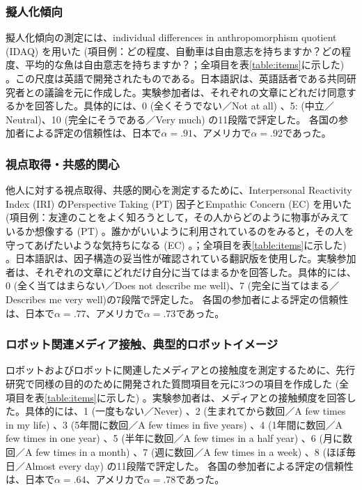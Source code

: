 \documentclass[a4j,12pt]{jreport}
\begin{document}
\subsubsection*{擬人化傾向}
擬人化傾向の測定には、individual differences in anthropomorphism quotient (IDAQ) \cite{idaq}を用いた (項目例：どの程度、自動車は自由意志を持ちますか？どの程度、平均的な魚は自由意志を持ちますか？；全項目を表\ref{table:items}に示した) 。この尺度は英語で開発されたものである。日本語訳は、英語話者である共同研究者との議論を元に作成した。実験参加者は、それぞれの文章にどれだけ同意するかを回答した。具体的には、0 (全くそうでない／Not at all) 、5: (中立／Neutral)、10 (完全にそうである／Very much) の11段階で評定した。
各国の参加者による評定の信頼性は、日本で$\alpha=.91$、アメリカで$\alpha=.92$であった。

\subsubsection*{視点取得・共感的関心}
他人に対する視点取得、共感的関心を測定するために、Interpersonal Reactivity Index (IRI) \cite{davis}のPerspective Taking (PT) 因子とEmpathic Concern (EC) を用いた (項目例：友達のことをよく知ろうとして，その人からどのように物事がみえているか想像する (PT) 。誰かがいいように利用されているのをみると，その人を守ってあげたいような気持ちになる (EC) 。；全項目を表\ref{table:items}に示した) 。日本語訳は、因子構造の妥当性が確認されている翻訳版\cite{taijin}を使用した。実験参加者は、それぞれの文章にどれだけ自分に当てはまるかを回答した。具体的には、0 (全く当てはまらない／Does not describe me well)、7 (完全に当てはまる／Describes me very well)の7段階で評定した。
各国の参加者による評定の信頼性は、日本で$\alpha=.77$、アメリカで$\alpha=.73$であった。

\subsubsection*{ロボット関連メディア接触、典型的ロボットイメージ}
ロボットおよびロボットに関連したメディアとの接触度を測定するために、先行研究\cite{mania}で同様の目的のために開発された質問項目を元に3つの項目を作成した (全項目を表\ref{table:items}に示した) 。実験参加者は、メディアとの接触頻度を回答した。具体的には、1 (一度もない／Never) 、2 (生まれてから数回／A few times in my life) 、3 (5年間に数回／A few times in five years) 、4 (1年間に数回／A few times in one year) 、5 (半年に数回／A few times in a half year) 、6 (月に数回／A few times in a month) 、7 (週に数回／A few times in a week) 、8 (ほぼ毎日／Almost every day) の11段階で評定した。
各国の参加者による評定の信頼性は、日本で$\alpha=.64$、アメリカで$\alpha=.78$であった。
\end{document}
